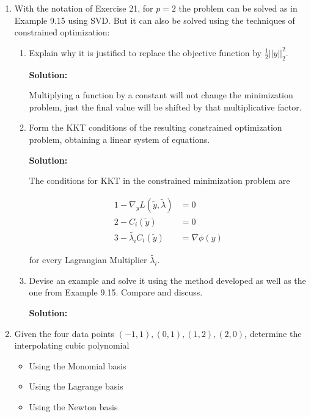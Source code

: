 \documentclass[12pt]{article}
\newcommand{\norm}[1]{\left|\left| #1 \right|\right|}
\renewcommand{\P}[1]{\left( #1 \right)}
\newcommand{\grad}{\nabla}
\begin{document}
\begin{enumerate}
\item With the notation of Exercise 21, for $p = 2$ the problem can be solved as
in Example 9.15 using SVD. But it can also be solved using the techniques of
constrained optimization:

\begin{enumerate}
  \item Explain why it is justified to replace the objective function by $\frac{1}{2}\norm{y}_{2}^{2}$.

  {\bf Solution:}

  Multiplying a function by a constant will not change the minimization problem, just
  the final value will be shifted by that multiplicative factor.

  \item Form the KKT conditions of the resulting constrained optimization problem,
  obtaining a linear system of equations.

  {\bf Solution:}

  The conditions for KKT in the constrained minimization problem are

  \begin{align*}
    1 - \grad_{y}L\left( \widetilde{y}, \widetilde{\lambda}\right) &= 0\\
    2 - C_{i}\P{\widetilde{y}} &= 0\\
    3 - \widetilde{\lambda_{i}}C_{i}\P{\widetilde{y}} &= \grad\phi(y)
  \end{align*}

  for every Lagrangian Multiplier $\widetilde{\lambda_{i}}$.

  \item Devise an example and solve it using the method developed as well as the one
  from Example 9.15. Compare and discuss.

  {\bf Solution:}

\end{enumerate}

\item Given the four data points $(-1, 1), (0,1), (1,2), (2,0)$, determine the
interpolating cubic polynomial

\begin{itemize}
  \item Using the Monomial basis
  \item Using the Lagrange basis
  \item Using the Newton basis
\end{itemize}


\end{enumerate}
\end{document}
